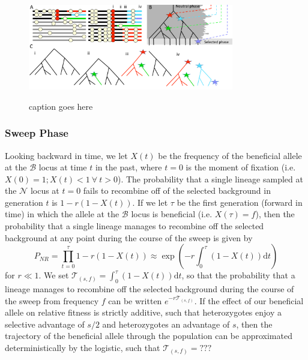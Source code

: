 \documentclass[a4paper,10pt]{article}
\newcommand{\fancyN}{$\mathcal N$ }
\newcommand{\fancyB}{$\mathcal B$ }
\begin{document}
\begin{figure}
	\includegraphics[width = 0.8\textwidth]{../Paper_Figures/Cartoon_of_soft_sweeps.pdf} \label{cartoon_fig_1}
	\caption{caption goes here}
\end{figure}


\subsubsection{Sweep Phase}
Looking backward in time, we let $X\left(t\right)$ be the frequency of the beneficial allele at the \fancyB locus at time $t$ in the past, where $t=0$ is the moment of fixation (i.e. $X\left(0\right) = 1; X\left(t\right) < 1\ \forall\ t > 0$). The probability that a single lineage sampled at the \fancyN locus at $t=0$ fails to recombine off of the selected background in generation $t$ is $1-r\left(1-X(t)\right)$. If we let $\tau$ be the first generation (forward in time) in which the allele at the \fancyB locus is beneficial (i.e. $X\left(\tau\right) = f$), then the probability that a single lineage manages to recombine off the selected background at any point during the course of the sweep is given by
\begin{equation}
P_{NR} = \prod_{t=0}^{\tau} 1-r\left(1-X(t)\right)  \approx \exp \left(-r \int_0^{\tau}(1-X\left(t\right))\mathrm{d} t \right)
\end{equation}
for $r \ll 1$. We set  $\mathcal{T}_{\left(s,f\right)} = \int_0^{\tau}(1-X\left(t\right))\mathrm{d}t$, so that the probability that a lineage manages to recombine off the selected background during the course of the sweep from frequency $f$ can be written $e^{-r\mathcal{T}_{\left(s,f\right)}}$. If the effect of our beneficial allele on relative fitness is strictly additive, such that heterozygotes enjoy a selective advantage of $s/2$ and heterozygotes an advantage of $s$, then the trajectory of the beneficial allele through the population can be approximated deterministically by the logistic, such that $\mathcal{T}_{\left(s,f\right)} = ???$
\end{document}
